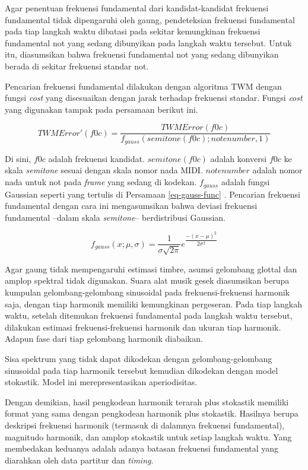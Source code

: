 Agar penentuan frekuensi fundamental dari kandidat-kandidat frekuensi fundamental tidak dipengaruhi oleh gaung, pendeteksian frekuensi fundamental pada tiap langkah waktu dibatasi pada sekitar kemungkinan frekuensi fundamental not yang sedang dibunyikan pada langkah waktu tersebut. Untuk itu, diasumsikan bahwa frekuensi fundamental not yang sedang dibunyikan berada di sekitar frekuensi standar not.

Pencarian frekuensi fundamental dilakukan dengan algoritma TWM dengan fungsi \textit{cost} yang disesuaikan dengan jarak terhadap frekuensi standar. Fungsi \textit{cost} yang digunakan tampak pada persamaan berikut ini.

\begin{equation}
  TWMError'(f0c) = \dfrac{TWMError(f0c)}{f_{gauss}(semitone(f0c);notenumber,1)}
\end{equation}

Di sini, $f0c$ adalah frekuensi kandidat. $semitone(f0c)$ adalah konversi $f0c$ ke skala \textit{semitone} sesuai dengan skala nomor nada MIDI. $notenumber$ adalah nomor nada untuk not pada \textit{frame} yang sedang di kodekan. $f_{gauss}$ adalah fungsi Gaussian seperti yang tertulis di Persamaan \ref{eq-gauss-func} \parencite{Walpole}. Pencarian frekuensi fundamental dengan cara ini mengasumsikan bahwa deviasi frekuensi fundamental --dalam skala \textit{semitone}-- berdistribusi Gaussian.

\begin{equation}
 f_{gauss}(x;\mu,\sigma) = \dfrac{1}{\sigma \sqrt{2\pi}}e^{\dfrac{-(x-\mu)^2}{2 \sigma^2}} \label{eq-gauss-func}
\end{equation}

Agar gaung tidak mempengaruhi estimasi timbre, asumsi gelombang glottal dan amplop spektral tidak digunakan. Suara alat musik gesek diasumsikan berupa kumpulan gelombang-gelombang sinusoidal pada frekuensi-frekuensi harmonik saja, dengan tiap harmonik memiliki kemungkinan pergeseran. Pada tiap langkah waktu, setelah ditemukan frekuensi fundamental pada langkah waktu tersebut, dilakukan estimasi frekuensi-frekuensi harmonik dan ukuran tiap harmonik. Adapun fase dari tiap gelombang harmonik diabaikan.

Sisa spektrum yang tidak dapat dikodekan dengan gelombang-gelombang sinusoidal pada tiap harmonik tersebut kemudian dikodekan dengan model stokastik. Model ini merepresentasikan aperiodisitas.

Dengan demikian, hasil pengkodean harmonik terarah plus stokastik memiliki format yang sama dengan pengkodean harmonik plus stokastik. Hasilnya berupa deskripsi frekuensi harmonik (termasuk di dalamnya frekuensi fundamental), magnitudo harmonik, dan amplop stokastik untuk setiap langkah waktu. Yang membedakan keduanya adalah adanya batasan frekuensi fundamental yang diarahkan oleh data partitur dan \textit{timing}.


